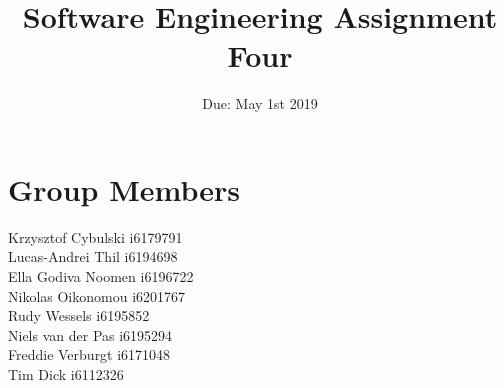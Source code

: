 \documentclass{article}
\title{Software Engineering Assignment Four}
\date{Due: May 1st 2019}
\begin{document}
\maketitle

\section*{Group Members}
Krzysztof Cybulski i6179791 \\
Lucas-Andrei Thil i6194698\\
Ella Godiva Noomen i6196722 \\
Nikolas Oikonomou i6201767\\
Rudy Wessels i6195852 \\
Niels van der Pas i6195294\\
Freddie Verburgt i6171048 \\
Tim Dick i6112326
\end{document}
